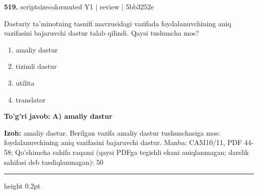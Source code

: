 \documentclass[10pt,a4paper]{article}
\begin{document}
{\bfseries\sffamily\color{ink} 519.} {scriptsizecolor{muted} Y1 | review | 5bb3252e}
\par
Dasturiy ta'minotning tasnifi mavzusidagi vazifada foydalanuvchining aniq vazifasini bajaruvchi dastur talab qilindi. Qaysi tushuncha mos?
\begin{enumerate}[label=\Alph*),leftmargin=9mm]
\item amaliy dastur
\item tizimli dastur
\item utilita
\item translator
\end{enumerate}
\begin{tcolorbox}[enhanced,breakable,colback=teal!4,colframe=teal!60!black,boxrule=0.45pt,arc=1.2mm,left=2.7mm,right=2.7mm,top=1.8mm,bottom=1.8mm,before skip=2mm,after skip=2mm]
{\bfseries\sffamily\color{teal}To'g'ri javob:} \textbf{A) amaliy dastur}
\par\smallskip
{\bfseries Izoh:} amaliy dastur. Berilgan vazifa amaliy dastur tushunchasiga mos: foydalanuvchining aniq vazifasini bajaruvchi dastur. Manba: CAM10/11, PDF 44-58; Qo'shimcha sahifa raqami (qaysi PDFga tegishli ekani aniqlanmagan; darslik sahifasi deb tasdiqlanmagan): 50
\end{tcolorbox}
\vspace{2mm}\hrule height 0.2pt\vspace{3mm}
\end{document}
